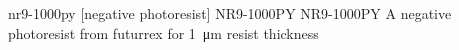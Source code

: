 \newglsXchemical%
{nr9-1000py}%
[negative photoresist]%
{NR9-1000PY}%
{NR9-1000PY}%
{A negative photoresist from \gls{futurrex} for \SI{1}{\micro\meter} resist thickness}%